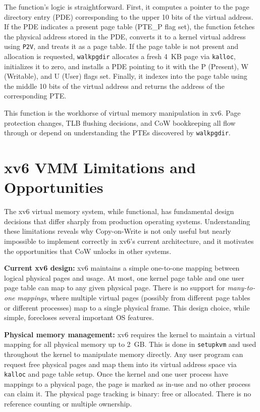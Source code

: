 \documentclass[11pt]{article}
\begin{document}
The function's logic is straightforward. First, it computes a pointer to the page directory entry (PDE) corresponding to the upper 10 bits of the virtual address. If the PDE indicates a present page table (PTE\_P flag set), the function fetches the physical address stored in the PDE, converts it to a kernel virtual address using \texttt{P2V}, and treats it as a page table. If the page table is not present and allocation is requested, \texttt{walkpgdir} allocates a fresh 4~KB page via \texttt{kalloc}, initializes it to zero, and installs a PDE pointing to it with the P (Present), W (Writable), and U (User) flags set. Finally, it indexes into the page table using the middle 10 bits of the virtual address and returns the address of the corresponding PTE.

This function is the workhorse of virtual memory manipulation in xv6. Page protection changes, TLB flushing decisions, and CoW bookkeeping all flow through or depend on understanding the PTEs discovered by \texttt{walkpgdir}.

\section{xv6 VMM Limitations and Opportunities}

The xv6 virtual memory system, while functional, has fundamental design decisions that differ sharply from production operating systems. Understanding these limitations reveals why Copy-on-Write is not only useful but nearly impossible to implement correctly in xv6's current architecture, and it motivates the opportunities that CoW unlocks in other systems.

\textbf{Current xv6 design:} xv6 maintains a simple one-to-one mapping between logical physical pages and usage. At most, one kernel page table and one user page table can map to any given physical page. There is no support for \emph{many-to-one mappings}, where multiple virtual pages (possibly from different page tables or different processes) map to a single physical frame. This design choice, while simple, forecloses several important OS features.

\textbf{Physical memory management:} xv6 requires the kernel to maintain a virtual mapping for all physical memory up to 2~GB. This is done in \texttt{setupkvm} and used throughout the kernel to manipulate memory directly. Any user program can request free physical pages and map them into its virtual address space via \texttt{kalloc} and page table setup. Once the kernel and one user process have mappings to a physical page, the page is marked as in-use and no other process can claim it. The physical page tracking is binary: free or allocated. There is no reference counting or multiple ownership.
\end{document}
